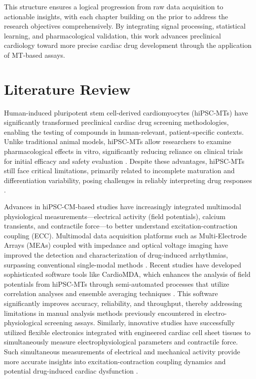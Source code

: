 \documentclass{report}
\begin{document}
This structure ensures a logical progression from raw data acquisition to actionable insights, with each chapter building on the prior to address the research objectives comprehensively. By integrating signal processing, statistical learning, and pharmacological validation, this work advances preclinical cardiology toward more precise cardiac drug development through the application of MT-based assays.
    
\chapter{Literature Review}
\label{literature}

    Human-induced pluripotent stem cell-derived cardiomyocytes (hiPSC-MTs) have significantly transformed preclinical cardiac drug screening methodologies, enabling the testing of compounds in human-relevant, patient-specific contexts. Unlike traditional animal models, hiPSC-MTs allow researchers to examine pharmacological effects in vitro, significantly reducing reliance on clinical trials for initial efficacy and safety evaluation \cite{Hnatiuk2021-ay, Lee2024}. Despite these advantages, hiPSC-MTs still face critical limitations, primarily related to incomplete maturation and differentiation variability, posing challenges in reliably interpreting drug responses \cite{Wu2021-eu}.

    Advances in hiPSC-CM-based studies have increasingly integrated multimodal physiological measurements—electrical activity (field potentials), calcium transients, and contractile force—to better understand excitation-contraction coupling (ECC). Multimodal data acquisition platforms such as Multi-Electrode Arrays (MEAs) coupled with impedance and optical voltage imaging have improved the detection and characterization of drug-induced arrhythmias, surpassing conventional single-modal methods \cite{Navarrete2013-wi}. Recent studies have developed sophisticated software tools like CardioMDA, which enhances the analysis of field potentials from hiPSC-MTs through semi-automated processes that utilize correlation analyses and ensemble averaging techniques \cite{Pradhapan2013CardiomyocyteMD}. This software significantly improves accuracy, reliability, and throughput, thereby addressing limitations in manual analysis methods previously encountered in electro-physiological screening assays. Similarly, innovative studies have successfully utilized flexible electronics integrated with engineered cardiac cell sheet tissues to simultaneously measure electrophysiological parameters and contractile force. Such simultaneous measurements of electrical and mechanical activity provide more accurate insights into excitation-contraction coupling dynamics and potential drug-induced cardiac dysfunction \cite{D1LC00411E}.
    
\end{document}
